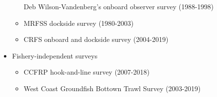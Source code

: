 \documentclass[11pt,
  english,
  a4paper,
]{article}
\begin{document}
\begin{itemize}
\begin{itemize}

    Deb Wilson-Vandenberg's onboard observer survey (1988-1998)

    \tagmcend\tagstructend\tagstructend

    \tagmcend\tagstructend\tagstructend
  \item


    MRFSS dockside survey (1980-2003)

    \tagmcend\tagstructend\tagstructend

    \tagmcend\tagstructend\tagstructend
  \item


    CRFS onboard and dockside survey (2004-2019)

    \tagmcend\tagstructend\tagstructend

    \tagmcend\tagstructend\tagstructend
  \end{itemize}

  \tagstructend
\item

  Fishery-independent surveys

  \tagmcend\tagstructend\tagstructend


  \begin{itemize}
  \item


    CCFRP hook-and-line survey (2007-2018)

    \tagmcend\tagstructend\tagstructend

    \tagmcend\tagstructend\tagstructend
  \item


    West Coast Groundfish Bottown Trawl Survey (2003-2019)

    \tagmcend\tagstructend\tagstructend

    \tagmcend\tagstructend\tagstructend
  \end{itemize}

  \tagstructend
\end{itemize}
\end{document}
